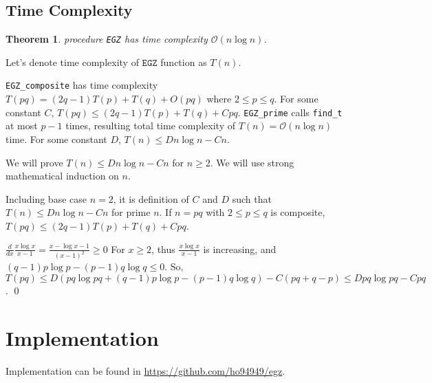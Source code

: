 \documentclass[11pt]{article}
\newtheorem{theorem}{Theorem}
\begin{document}
\subsection{Time Complexity}


\begin{theorem}

procedure \texttt{EGZ} has time complexity $\mathcal{O}(n \log n)$.

\end{theorem}

Let's denote time complexity of $\texttt{EGZ}$ function as $T(n)$.

\texttt{EGZ\_composite} has time complexity $T(pq) = (2q-1)T(p) + T(q) + O(pq)$ where $2 \le p \le q$. For some constant $C$, $T(pq) \le (2q-1)T(p) + T(q) + Cpq$. \texttt{EGZ\_prime} calls \texttt{find\_t} at most $p-1$ times, resulting total time complexity of $T(n) = \mathcal{O}(n \log n)$ time. For some constant $D$, $T(n) \le D n \log n - C n$.

We will prove $T(n) \le D n \log n - C n$ for $n \ge 2$. We will use strong mathematical induction on $n$.

Including base case $n = 2$, it is definition of $C$ and $D$ such that $T(n) \le D n \log n - C n$ for prime $n$. If $n = pq$ with $2 \le p \le q$ is composite, $T(pq) \le (2q-1)T(p) + T(q) + Cpq$.

$\frac{d}{dx} \frac{x \log x}{x-1} = \frac{x - \log x - 1}{(x-1)^2} \ge 0$ For $x \ge 2$, thus $\frac{x \log x}{x-1}$ is increasing, and $(q-1) p \log p - (p-1) q \log q \le 0$. So, $T(pq) \le D ( pq \log pq + (q-1) p \log p - (p-1) q \log q) - C (pq + q - p) \le D pq \log pq - C pq$. \qed 

\section{Implementation}

Implementation can be found in \url{https://github.com/ho94949/egz}.





\end{document}
